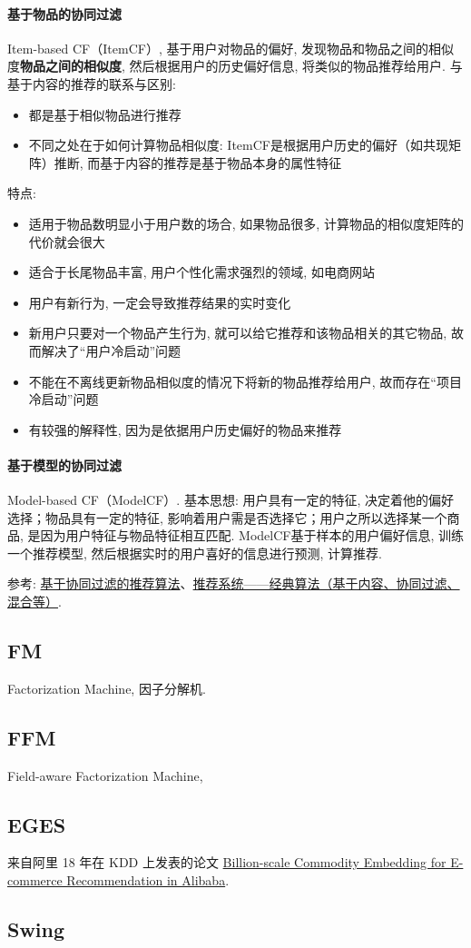 \paragraph{基于物品的协同过滤}
Item-based CF（ItemCF）, 基于用户对物品的偏好, 发现物品和物品之间的相似度\textbf{物品之间的相似度}, 然后根据用户的历史偏好信息, 将类似的物品推荐给用户. 与基于内容的推荐的联系与区别: 
\begin{itemize}
	\item 都是基于相似物品进行推荐
	\item 不同之处在于如何计算物品相似度: ItemCF是根据用户历史的偏好（如共现矩阵）推断, 而基于内容的推荐是基于物品本身的属性特征
\end{itemize}
特点: 
\begin{itemize}
	\item 适用于物品数明显小于用户数的场合, 如果物品很多, 计算物品的相似度矩阵的代价就会很大
	\item 适合于长尾物品丰富, 用户个性化需求强烈的领域, 如电商网站
	\item 用户有新行为, 一定会导致推荐结果的实时变化
	\item 新用户只要对一个物品产生行为, 就可以给它推荐和该物品相关的其它物品, 故而解决了“用户冷启动”问题
	\item 不能在不离线更新物品相似度的情况下将新的物品推荐给用户, 故而存在“项目冷启动”问题
	\item 有较强的解释性, 因为是依据用户历史偏好的物品来推荐
\end{itemize}


\paragraph{基于模型的协同过滤}
Model-based CF（ModelCF）. 基本思想: 用户具有一定的特征, 决定着他的偏好选择；物品具有一定的特征, 影响着用户需是否选择它；用户之所以选择某一个商品, 是因为用户特征与物品特征相互匹配. ModelCF基于样本的用户偏好信息, 训练一个推荐模型, 然后根据实时的用户喜好的信息进行预测, 计算推荐. 

参考: \href{https://www.cnblogs.com/shengyang17/p/11516532.html}{基于协同过滤的推荐算法}、\href{https://zhuanlan.zhihu.com/p/108759393}{推荐系统——经典算法（基于内容、协同过滤、混合等）}. 




\subsection{FM}
Factorization Machine, 因子分解机. 

\subsection{FFM}
Field-aware Factorization Machine, 

\subsection{EGES}
来自阿里 18 年在 KDD 上发表的论文 \href{https://arxiv.org/pdf/1803.02349.pdf}{Billion-scale Commodity Embedding for E-commerce	Recommendation in Alibaba}.

\subsection{Swing}
